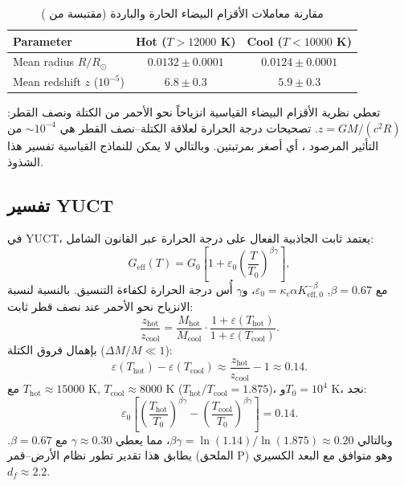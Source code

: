 \documentclass[12pt,a4paper]{article}
\newcommand{\eps}{\varepsilon}
\newcommand{\kappac}{\kappa_c}
\newcommand{\df}{d_{\!f}}
\newcommand{\alp}{\alpha}
\theoremstyle{remark}
\begin{document}
	\begin{otherlanguage}{english}
		\begin{table}[H]
			\centering
			\caption{مقارنة معاملات الأقزام البيضاء الحارة والباردة (مقتبسة من \cite{Crumpler2024})}
			\label{tab:wd-results}
			\begin{tabular}{lcc}
				\toprule
				\textbf{Parameter} & \textbf{Hot (\(T>12000\) K)} & \textbf{Cool (\(T<10000\) K)} \\
				\midrule
				Mean radius \(R/R_\odot\) & \(0.0132 \pm 0.0001\) & \(0.0124 \pm 0.0001\) \\
				Mean redshift \(z\) (\(10^{-5}\)) & \(6.8 \pm 0.3\) & \(5.9 \pm 0.3\) \\
				\bottomrule
			\end{tabular}
		\end{table}
	\end{otherlanguage}
	
	تعطي نظرية الأقزام البيضاء القياسية انزياحاً نحو الأحمر من الكتلة ونصف القطر: \(z = GM/(c^2 R)\). تصحيحات درجة الحرارة لعلاقة الكتلة–نصف القطر هي \(\sim 10^{-4}\) من التأثير المرصود \cite{Fontaine2001}، أي أصغر بمرتبتين. وبالتالي لا يمكن للنماذج القياسية تفسير هذا الشذوذ.
	
	\subsection{تفسير YUCT}
	\label{subsec:wd-yuct-interp}
	
	في YUCT، يعتمد ثابت الجاذبية الفعال على درجة الحرارة عبر القانون الشامل:
	\[
	G_{\mathrm{eff}}(T) = G_0\left[1 + \eps_0 \left(\frac{T}{T_0}\right)^{\beta\gamma}\right],
	\]
	مع \(\beta = 0.67\), \(\eps_0 = \kappac \alp K_{\mathrm{eff},0}^{-\beta}\)، و\(\gamma\) أُس درجة الحرارة لكفاءة التنسيق. بالنسبة لنسبة الانزياح نحو الأحمر عند نصف قطر ثابت:
	\[
	\frac{z_{\mathrm{hot}}}{z_{\mathrm{cool}}} = \frac{M_{\mathrm{hot}}}{M_{\mathrm{cool}}} \cdot \frac{1 + \eps(T_{\mathrm{hot}})}{1 + \eps(T_{\mathrm{cool}})}.
	\]
	بإهمال فروق الكتلة (\(\Delta M/M \ll 1\)):
	\[
	\eps(T_{\mathrm{hot}}) - \eps(T_{\mathrm{cool}}) \approx \frac{z_{\mathrm{hot}}}{z_{\mathrm{cool}}} - 1 \approx 0.14.
	\]
	مع \(T_{\mathrm{hot}} \approx 15000\) K, \(T_{\mathrm{cool}} \approx 8000\) K (\(T_{\mathrm{hot}}/T_{\mathrm{cool}} = 1.875\))، و\(T_0 = 10^4\) K، نجد:
	\[
	\eps_0 \left[\left(\frac{T_{\mathrm{hot}}}{T_0}\right)^{\beta\gamma} - \left(\frac{T_{\mathrm{cool}}}{T_0}\right)^{\beta\gamma}\right] = 0.14.
	\]
	وبالتالي \(\beta\gamma = \ln(1.14)/\ln(1.875) \approx 0.20\)، مما يعطي \(\gamma \approx 0.30\) مع \(\beta = 0.67\). يطابق هذا تقدير تطور نظام الأرض–قمر \cite{Lantink2022, Farhat2022} (الملحق P) وهو متوافق مع البعد الكسيري \(\df \approx 2.2\).
	
\end{document}
